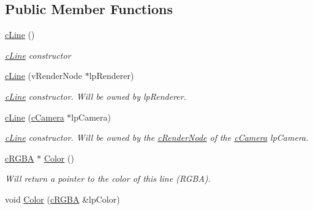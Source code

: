 \subsection*{Public Member Functions}
\begin{DoxyCompactItemize}
\item 
\hypertarget{classc_line_afc96602bef17f3d03af9685532af395d}{
\hyperlink{classc_line_afc96602bef17f3d03af9685532af395d}{cLine} ()}
\label{classc_line_afc96602bef17f3d03af9685532af395d}

\begin{DoxyCompactList}\small\item\em \hyperlink{classc_line}{cLine} constructor \end{DoxyCompactList}\item 
\hypertarget{classc_line_aa9c1d8af366fbcd7e5f71e82906a1b2c}{
\hyperlink{classc_line_aa9c1d8af366fbcd7e5f71e82906a1b2c}{cLine} (vRenderNode $\ast$lpRenderer)}
\label{classc_line_aa9c1d8af366fbcd7e5f71e82906a1b2c}

\begin{DoxyCompactList}\small\item\em \hyperlink{classc_line}{cLine} constructor. Will be owned by lpRenderer. \end{DoxyCompactList}\item 
\hypertarget{classc_line_a8a84cc1fe6a5a875faece391612347fc}{
\hyperlink{classc_line_a8a84cc1fe6a5a875faece391612347fc}{cLine} (\hyperlink{classc_camera}{cCamera} $\ast$lpCamera)}
\label{classc_line_a8a84cc1fe6a5a875faece391612347fc}

\begin{DoxyCompactList}\small\item\em \hyperlink{classc_line}{cLine} constructor. Will be owned by the \hyperlink{classc_render_node}{cRenderNode} of the \hyperlink{classc_camera}{cCamera} lpCamera. \end{DoxyCompactList}\item 
\hypertarget{classc_line_a9406a39ed9a76fb03673345b6e0e7255}{
\hyperlink{classc_r_g_b_a}{cRGBA} $\ast$ \hyperlink{classc_line_a9406a39ed9a76fb03673345b6e0e7255}{Color} ()}
\label{classc_line_a9406a39ed9a76fb03673345b6e0e7255}

\begin{DoxyCompactList}\small\item\em Will return a pointer to the color of this line (RGBA). \end{DoxyCompactList}\item 
\hypertarget{classc_line_a06c260e9319257479988f3867ad12d0e}{
void \hyperlink{classc_line_a06c260e9319257479988f3867ad12d0e}{Color} (\hyperlink{classc_r_g_b_a}{cRGBA} \&lpColor)}
\label{classc_line_a06c260e9319257479988f3867ad12d0e}


\end{DoxyCompactItemize}
